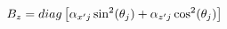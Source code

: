 \vspace{-0.1cm}
\begin{equation}
    B_z = diag\left[\alpha_{x'j}\sin^2(\theta_j) + \alpha_{z'j}\cos^2(\theta_j)\right]
    \label{eq:rotated_coef2}
    \vspace{-0.05cm}
\end{equation}